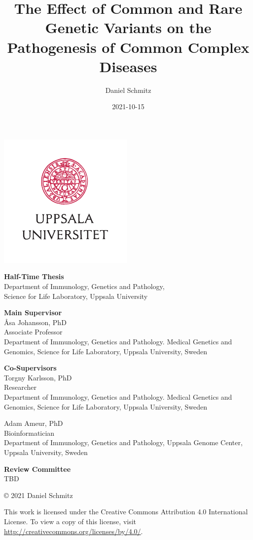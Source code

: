 \documentclass[draft]{scrbook}
\title{The Effect of Common and Rare Genetic Variants on the Pathogenesis of Common Complex Diseases}
\author{Daniel Schmitz}
\date{2021-10-15}
\begin{document}
\frontmatter
\newlength{\oldparindent}
\setlength{\oldparindent}{\parindent}

\parskip 6pt
\parindent 0pt

\begin{titlepage}
    \centering
    \makeatletter
    \LARGE \sffamily \@title

    \Large \rmfamily \@author

    \vspace*{\fill}
    \includegraphics[width=.5\pagewidth]{img/UU_logo_4f_42.pdf}

    \vspace*{\fill}
    \normalsize
    \textbf{Half-Time Thesis} \\
    Department of Immunology, Genetics and Pathology,\\
    Science for Life Laboratory, Uppsala University

    \@date
    \makeatother
\end{titlepage}

{ %
    \raggedright
    \textbf{Main Supervisor}\\
    Åsa Johansson, PhD\\
    Associate Professor \\
    Department of Immunology, Genetics and Pathology. Medical Genetics and Genomics, Science for Life Laboratory, Uppsala University, Sweden

    \textbf{Co-Supervisors}\\
    Torgny Karlsson, PhD\\
    Researcher \\
    Department of Immunology, Genetics and Pathology. Medical Genetics and Genomics, Science for Life Laboratory, Uppsala University, Sweden

    Adam Ameur, PhD \\
    Bioinformatician \\
    Department of Immunology, Genetics and Pathology, Uppsala Genome Center, Uppsala University, Sweden

    \textbf{Review Committee}\\
    TBD

    \vfill
    \footnotesize
    © 2021 Daniel Schmitz

    This work is licensed under the Creative Commons Attribution 4.0 International License. To view a copy of this license, visit \url{http://creativecommons.org/licenses/by/4.0/}.
}
\end{document}
